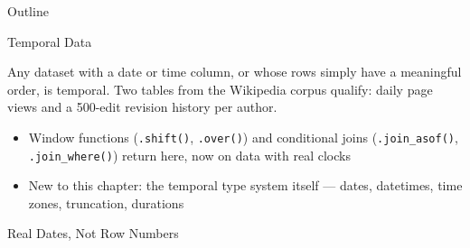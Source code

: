 \documentclass[8pt,aspectratio=169]{beamer}
\begin{document}
\begin{outlineframe}{Outline}
\end{outlineframe}

\begin{textframe}{Temporal Data}

Any dataset with a date or time column, or whose rows simply have a meaningful order, is temporal. Two tables from the Wikipedia corpus qualify: daily page views and a 500-edit revision history per author.

\begin{itemize}
\item Window functions (\texttt{.shift()}, \texttt{.over()}) and conditional joins (\texttt{.join\_asof()}, \texttt{.join\_where()}) return here, now on data with real clocks
\item New to this chapter: the temporal type system itself --- dates, datetimes, time zones, truncation, durations
\end{itemize}

\end{textframe}

\begin{rightframe}{Real Dates, Not Row Numbers}
\end{rightframe}
\end{document}
